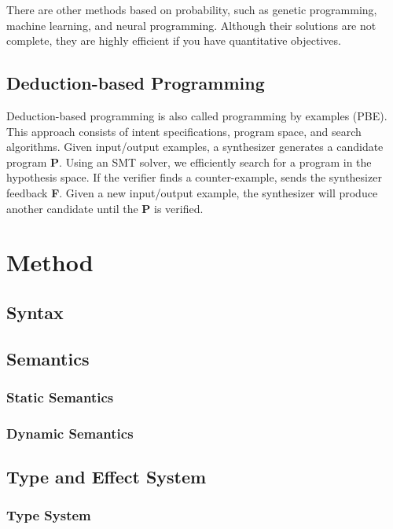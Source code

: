 \documentclass[12pt, a4paper, titlepage]{report}
\begin{document}
    There are other methods based on probability, such as genetic programming, machine learning, and neural programming.
    Although their solutions are not complete, they are highly efficient if you have quantitative objectives.

  \section{Deduction-based Programming}
    Deduction-based programming is also called programming by examples (PBE).
    This approach consists of intent specifications, program space, and search algorithms.
    Given input/output examples, a synthesizer generates a candidate program \textbf{P}.
    Using an SMT solver, we efficiently search for a program in the hypothesis space.
    If the verifier finds a counter-example, sends the synthesizer feedback \textbf{F}.
    Given a new input/output example, the synthesizer will produce another candidate until the \textbf{P} is verified.



\chapter{Method}\label{chapter:method}
  \section{Syntax}
  \section{Semantics}
    \subsection{Static Semantics} %
    \subsection{Dynamic Semantics} %
  \section{Type and Effect System}
    \subsection{Type System}
\end{document}
